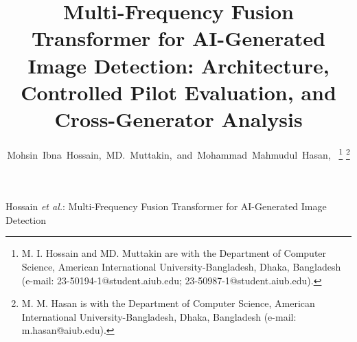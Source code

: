 \documentclass[journal]{IEEEtran}
\begin{document}
\title{Multi-Frequency Fusion Transformer for AI-Generated Image Detection: Architecture, Controlled Pilot Evaluation, and Cross-Generator Analysis}

\author{Mohsin~Ibna~Hossain,~MD.~Muttakin,~and~Mohammad~Mahmudul~Hasan,~%
\thanks{M. I. Hossain and MD. Muttakin are with the Department of Computer Science, American International University-Bangladesh, Dhaka, Bangladesh (e-mail: 23-50194-1@student.aiub.edu; 23-50987-1@student.aiub.edu).}%
\thanks{M. M. Hasan is with the Department of Computer Science, American International University-Bangladesh, Dhaka, Bangladesh (e-mail: m.hasan@aiub.edu).}}

%
{Hossain \MakeLowercase{\textit{et al.}}: Multi-Frequency Fusion Transformer for AI-Generated Image Detection}

\maketitle
\end{document}
